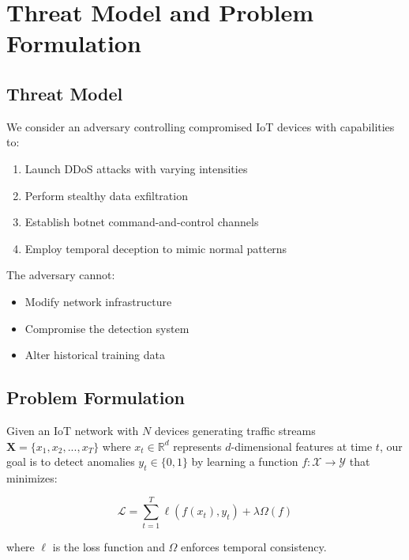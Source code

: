 \documentclass[10pt,conference]{IEEEtran}
\begin{document}
\section{Threat Model and Problem Formulation}

\subsection{Threat Model}

We consider an adversary controlling compromised IoT devices with capabilities to:
\begin{enumerate}
    \item Launch DDoS attacks with varying intensities
    \item Perform stealthy data exfiltration
    \item Establish botnet command-and-control channels
    \item Employ temporal deception to mimic normal patterns
\end{enumerate}

The adversary cannot:
\begin{itemize}
    \item Modify network infrastructure
    \item Compromise the detection system
    \item Alter historical training data
\end{itemize}

\subsection{Problem Formulation}

Given an IoT network with $N$ devices generating traffic streams $\mathbf{X} = \{x_1, x_2, ..., x_T\}$ where $x_t \in \mathbb{R}^d$ represents $d$-dimensional features at time $t$, our goal is to detect anomalies $y_t \in \{0, 1\}$ by learning a function $f: \mathcal{X} \rightarrow \mathcal{Y}$ that minimizes:

\begin{equation}
\mathcal{L} = \sum_{t=1}^{T} \ell(f(x_t), y_t) + \lambda \Omega(f)
\end{equation}

where $\ell$ is the loss function and $\Omega$ enforces temporal consistency.
\end{document}
